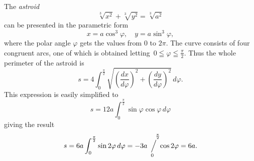 \documentclass[12pt]{article}
\newcommand{\sijoitus}[2]%
{\operatornamewithlimits{\Big/}_{\!\!\!#1}^{\,#2}}
\begin{document}
The {\em astroid}
$$\sqrt[3]{x^2}+\sqrt[3]{y^2} = \sqrt[3]{a^2}$$
can be presented in the parametric form
$$x = a\cos^3\varphi,\quad y = a\sin^3\varphi,$$
where the polar angle $\varphi$ gets the values from $0$ to $2\pi$.  The curve consists of four congruent arcs, one of which is obtained letting\, $0\leqq \varphi \leqq \frac{\pi}{2}$.  Thus the whole perimeter of the astroid is
$$s = 
4\int_0^{\frac{\pi}{2}}\!\sqrt{\left(\frac{dx}{d\varphi}\right)^2+\left(\frac{dy}{d\varphi}\right)^2}\,d\varphi.$$
This expression is easily simplified to
$$s = 12a\int_0^{\frac{\pi}{2}}\sin\varphi\cos\varphi\,d\varphi$$
giving the result 
$$s = 6a\int_0^{\frac{\pi}{2}}\sin{2\varphi}\,d\varphi = 
-3a\!\sijoitus{0}{\quad \frac{\pi}{2}}\!\cos{2\varphi} = 6a.$$


\end{document}
